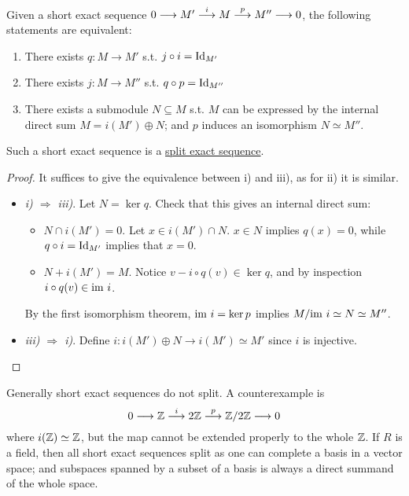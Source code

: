 \documentclass{article}
\begin{document}
\begin{proposition}\label{prop:criterion for split}
    Given a short exact sequence $0 \longrightarrow M' \overset{i}{\longrightarrow} M \overset{p}{\longrightarrow} M'' \longrightarrow 0$, the following statements are equivalent:
    \begin{enumerate}[label=\roman*)]
        \item There exists $q: M \to M'$ s.t. $j \circ i = \mathrm{Id}_{M'}$
        \item There exists $j: M \to M''$ s.t. $q \circ p = \mathrm{Id}_{M''}$
        \item There exists a submodule $N \subseteq M$ s.t. $M$ can be expressed by the internal direct sum $M = i(M') \oplus N$; and $p$ induces an isomorphism $N \simeq M''$.
    \end{enumerate}
    Such a short exact sequence is a \underline{split exact sequence}.
\end{proposition}

\begin{proof}
    It suffices to give the equivalence between i) and iii), as for ii) it is similar.
    \begin{itemize}
        \item \emph{i) $\Rightarrow$ iii)}. Let $N = \ker q$. Check that this gives an internal direct sum:
            \begin{itemize}
                \item $N \cap i(M') = 0$. Let $x \in i(M') \cap N$. $x \in N$ implies $q(x) = 0$, while $q \circ i = \mathrm{Id}_{M'}$ implies that $x = 0$.
                \item $N + i(M') = M$. Notice $v - i \circ q(v) \in \ker q$, and by inspection $i\circ q(v) \in \mathrm{im}\  i$.
            \end{itemize}
            By the first isomorphism theorem, $\mathrm{im}\  i = \ker p$ implies $M / \mathrm{im}\  i \simeq N \simeq M''$.
        \item \emph{iii) $\Rightarrow$ i)}. Define $i: i(M') \oplus N \to i(M') \simeq M'$ since $i$ is injective.
    \end{itemize}
\end{proof}

\begin{remark}
    Generally short exact sequences do not split. A counterexample is
    \[
        0 \longrightarrow \mathbb{Z} \overset{i}{\longrightarrow} 2\mathbb{Z} \overset{p}{\longrightarrow} \mathbb{Z}/2\mathbb{Z} \longrightarrow 0
    \]
    where $i(\mathbb{Z}) \simeq \mathbb{Z}$, but the map cannot be extended properly to the whole $\mathbb{Z}$. If $R$ is a field, then all short exact sequences split as one can complete a basis in a vector space; and subspaces spanned by a subset of a basis is always a direct summand of the whole space.
\end{remark}
\end{document}
